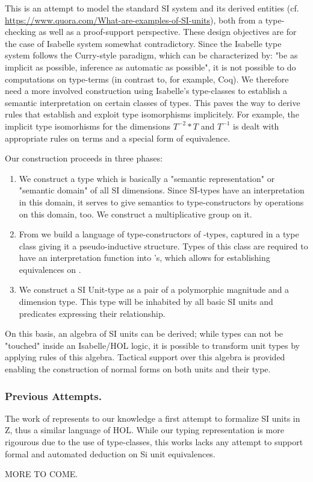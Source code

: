 \documentclass[11pt,a4paper]{book}
\begin{document}
This is an attempt to model the standard SI system and its derived entities (cf.
\url{https://www.quora.com/What-are-examples-of-SI-units}),
both from a type-checking as well as a proof-support perspective.
These design objectives are for the case of Isabelle system somewhat contradictory.
Since the Isabelle type system follows the Curry-style paradigm, which can be 
characterized by: "be as implicit as possible, inference as automatic as possible", it is not
possible to do computations on type-terms (in contrast to, for example, Coq). We therefore
need a more involved construction using Isabelle's type-classes to establish a semantic 
interpretation on certain classes of types. This paves the way to derive rules that
establish and exploit type isomorphisms implicitely. For example, the implicit
type isomorhisms for the dimensions $T^{-2} * T$ and $T^{-1}$ is dealt with appropriate
rules on terms and a special form of equivalence. 

Our construction proceeds in three phases:
\begin{enumerate}%
\item We construct a type  which is basically a "semantic representation" or
"semantic domain" of all SI dimensions. Since SI-types have an interpretation in this domain,
it serves to give semantics to type-constructors by operations on this domain, too.
We construct a multiplicative group on it.

\item From  we build a language of type-constructors of -types, 
 captured in a type class  giving it a pseudo-inductive structure. Types of
 this class are required to have  an interpretation function into 's, which
 allows for establishing equivalences on .
      
\item We construct a SI Unit-type as a pair of a polymorphic magnitude and a dimension type.
  This type will be inhabited by all basic SI units and predicates expressing their relationship.
\end{enumerate}%

On this basis, an algebra of SI units can be derived; while types can not be "touched" inside
an Isabelle/HOL logic, it is possible to transform unit types by applying rules of this algebra.
Tactical support over this algebra is provided enabling the construction of normal forms on 
both units and their type.  

\subsubsection{Previous Attempts.} The work of \cite{HayesBrendan95} represents to our knowledge a
first attempt to formalize SI units in Z, thus a similar language of HOL. While our typing
representation is more rigourous due to the use of type-classes, this works lacks any attempt
to support formal and automated deduction on Si unit equivalences.

MORE TO COME.





\end{document}
